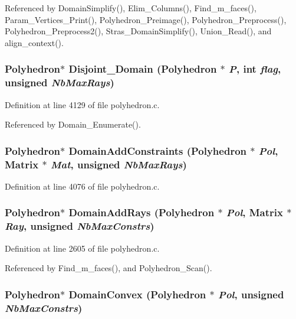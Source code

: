 Referenced by Domain\-Simplify(), Elim\_\-Columns(), Find\_\-m\_\-faces(), Param\_\-Vertices\_\-Print(), Polyhedron\_\-Preimage(), Polyhedron\_\-Preprocess(), Polyhedron\_\-Preprocess2(), Stras\_\-Domain\-Simplify(), Union\_\-Read(), and align\_\-context().

\subsubsection{\setlength{\rightskip}{0pt plus 5cm}Polyhedron$\ast$ Disjoint\_\-Domain (Polyhedron $\ast$ {\em P}, int {\em flag}, unsigned {\em Nb\-Max\-Rays})}\label{polyhedron_8c_a56}




Definition at line 4129 of file polyhedron.c.

Referenced by Domain\_\-Enumerate().

\subsubsection{\setlength{\rightskip}{0pt plus 5cm}Polyhedron$\ast$ Domain\-Add\-Constraints (Polyhedron $\ast$ {\em Pol}, Matrix $\ast$ {\em Mat}, unsigned {\em Nb\-Max\-Rays})}\label{polyhedron_8c_a55}




Definition at line 4076 of file polyhedron.c.
\subsubsection{\setlength{\rightskip}{0pt plus 5cm}Polyhedron$\ast$ Domain\-Add\-Rays (Polyhedron $\ast$ {\em Pol}, Matrix $\ast$ {\em Ray}, unsigned {\em Nb\-Max\-Constrs})}\label{polyhedron_8c_a35}




Definition at line 2605 of file polyhedron.c.

Referenced by Find\_\-m\_\-faces(), and Polyhedron\_\-Scan().

\subsubsection{\setlength{\rightskip}{0pt plus 5cm}Polyhedron$\ast$ Domain\-Convex (Polyhedron $\ast$ {\em Pol}, unsigned {\em Nb\-Max\-Constrs})}\label{polyhedron_8c_a45}




